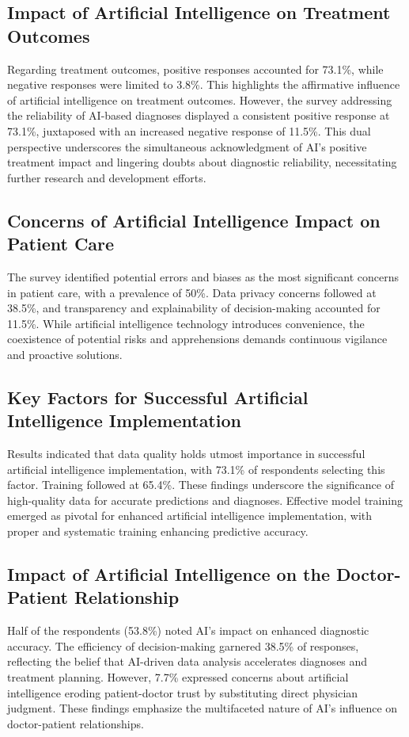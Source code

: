\documentclass{ieeeaccess}
\begin{document}
\subsection{Impact of Artificial Intelligence on Treatment Outcomes}
Regarding treatment outcomes, positive responses accounted for 73.1\%, while negative responses were limited to 3.8\%. This highlights the affirmative influence of artificial intelligence on treatment outcomes. However, the survey addressing the reliability of AI-based diagnoses displayed a consistent positive response at 73.1\%, juxtaposed with an increased negative response of 11.5\%. This dual perspective underscores the simultaneous acknowledgment of AI's positive treatment impact and lingering doubts about diagnostic reliability, necessitating further research and development efforts.

\subsection{Concerns of Artificial Intelligence Impact on Patient Care}
The survey identified potential errors and biases as the most significant concerns in patient care, with a prevalence of 50\%. Data privacy concerns followed at 38.5\%, and transparency and explainability of decision-making accounted for 11.5\%. While artificial intelligence technology introduces convenience, the coexistence of potential risks and apprehensions demands continuous vigilance and proactive solutions.

\subsection{Key Factors for Successful Artificial Intelligence Implementation}
Results indicated that data quality holds utmost importance in successful artificial intelligence implementation, with 73.1\% of respondents selecting this factor. Training followed at 65.4\%. These findings underscore the significance of high-quality data for accurate predictions and diagnoses. Effective model training emerged as pivotal for enhanced artificial intelligence implementation, with proper and systematic training enhancing predictive accuracy.

\subsection{Impact of Artificial Intelligence on the Doctor-Patient Relationship}
Half of the respondents (53.8\%) noted AI's impact on enhanced diagnostic accuracy. The efficiency of decision-making garnered 38.5\% of responses, reflecting the belief that AI-driven data analysis accelerates diagnoses and treatment planning. However, 7.7\% expressed concerns about artificial intelligence eroding patient-doctor trust by substituting direct physician judgment. These findings emphasize the multifaceted nature of AI's influence on doctor-patient relationships.
\end{document}
